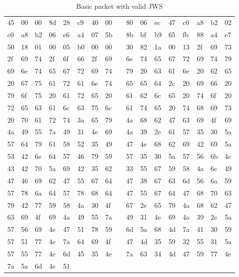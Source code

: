 \begin{table}[]
\centering
\begin{tabular}{lllllllllllllllll}
45 & 00 & 00 & 8d & 28 & c9 & 40 & 00 &  & 80 & 06 & ec & 47 & c0 & a8 & b2 & 02 \\
c0 & a8 & b2 & 06 & e6 & a4 & 07 & 5b &  & 8b & bf & b9 & 65 & fb & 88 & a4 & e7 \\
50 & 18 & 01 & 00 & 05 & b0 & 00 & 00 &  & 30 & 82 & 1a & 00 & 13 & 2f & 69 & 73 \\
2f & 69 & 74 & 2f & 6f & 66 & 2f & 69 &  & 6e & 74 & 65 & 67 & 72 & 69 & 74 & 79 \\
69 & 6e & 74 & 65 & 67 & 72 & 69 & 74 &  & 79 & 20 & 63 & 61 & 6e & 20 & 62 & 65 \\
20 & 67 & 75 & 61 & 72 & 61 & 6e & 74 &  & 65 & 65 & 64 & 2c & 20 & 69 & 66 & 20 \\
79 & 6f & 75 & 20 & 61 & 72 & 65 & 20 &  & 61 & 62 & 6c & 65 & 20 & 74 & 6f & 20 \\
72 & 65 & 63 & 61 & 6c & 63 & 75 & 6c &  & 61 & 74 & 65 & 20 & 74 & 68 & 69 & 73 \\
20 & 70 & 61 & 72 & 74 & 3a & 65 & 79 &  & 4a & 68 & 62 & 47 & 63 & 69 & 4f & 69 \\
4a & 49 & 55 & 7a & 49 & 31 & 4e & 69 &  & 4a & 39 & 2e & 61 & 57 & 35 & 30 & 5a \\
57 & 64 & 79 & 61 & 58 & 52 & 35 & 49 &  & 47 & 4e & 68 & 62 & 69 & 42 & 69 & 5a \\
53 & 42 & 6e & 64 & 57 & 46 & 79 & 59 &  & 57 & 35 & 30 & 5a & 57 & 56 & 6b & 4c \\
43 & 42 & 70 & 5a & 69 & 42 & 35 & 62 &  & 33 & 55 & 67 & 59 & 58 & 4a & 6c & 49 \\
47 & 46 & 69 & 62 & 47 & 55 & 67 & 64 &  & 47 & 38 & 67 & 63 & 6d & 56 & 6a & 59 \\
57 & 78 & 6a & 64 & 57 & 78 & 68 & 64 &  & 47 & 55 & 67 & 64 & 47 & 68 & 70 & 63 \\
79 & 42 & 77 & 59 & 58 & 4a & 30 & 4f &  & 67 & 2e & 65 & 79 & 4a & 68 & 62 & 47 \\
63 & 69 & 4f & 69 & 4a & 49 & 55 & 7a &  & 49 & 31 & 4e & 69 & 4a & 39 & 2e & 5a \\
57 & 56 & 69 & 4e & 47 & 51 & 78 & 59 &  & 6d & 5a & 68 & 4d & 7a & 41 & 30 & 59 \\
57 & 51 & 77 & 4e & 7a & 64 & 69 & 4f &  & 47 & 4d & 35 & 59 & 32 & 55 & 31 & 5a \\
57 & 55 & 77 & 4e & 6d & 45 & 35 & 4e &  & 7a & 63 & 34 & 4d & 47 & 59 & 77 & 4e \\
7a & 5a & 6d & 4e & 51
\end{tabular}
\caption{Basic packet with valid JWS}
\label{tab:my-table}
\end{table}
